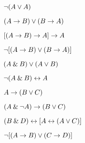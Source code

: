 \begin{earg}
\item  ${\neg} (A \vee A)$\vspace{.5ex}							%
\item $(A \rightarrow B) \vee (B \rightarrow A)$\vspace{.5ex}					%
\item $[(A \rightarrow B) \rightarrow A] \rightarrow A$\vspace{.5ex}					%
\item ${\neg}[( A \rightarrow B) \vee (B \rightarrow A)]$\vspace{.5ex}			%
\item $(A \mathbin{\&} B) \vee (A \vee B)$\vspace{.5ex} 				%
\item ${\neg}(A\mathbin{\&} B) \leftrightarrow A$\vspace{.5ex} 					%
\item $A\rightarrow(B\vee C)$\vspace{.5ex} 							%
\item $(A \mathbin{\&}{\neg} A) \rightarrow (B \vee C)$\vspace{.5ex} 			%
\item $(B\mathbin{\&} D) \leftrightarrow [A \leftrightarrow(A \vee C)]$\vspace{.5ex}			%
\item ${\neg}[(A \rightarrow B) \vee (C \rightarrow D)]$\vspace{.5ex} 			%
\end{earg}




